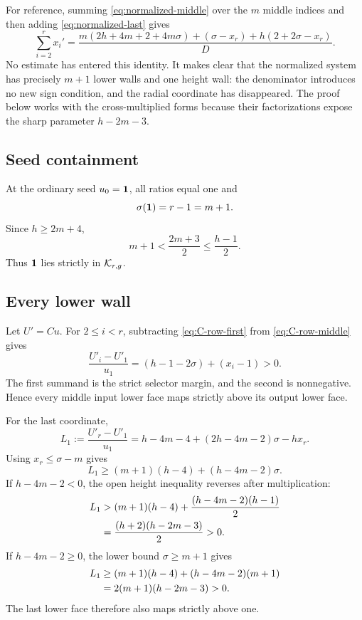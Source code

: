 \documentclass[11pt]{article}
\theoremstyle{remark}
\numberwithin{equation}{section}
\begin{document}
For reference, summing \eqref{eq:normalized-middle} over the \(m\) middle
indices and then adding \eqref{eq:normalized-last} gives
\begin{equation}\label{eq:normalized-height-map}
\sum_{i=2}^{r}x_i'
=\frac{
m(2h+4m+2+4m\sigma)+(\sigma-x_r)
+h(2+2\sigma-x_r)}
{D}.
\end{equation}
No estimate has entered this identity.  It makes clear that the normalized
system has precisely \(m+1\) lower walls and one height wall: the denominator
introduces no new sign condition, and the radial coordinate has disappeared.
The proof below works with the cross-multiplied forms because their
factorizations expose the sharp parameter \(h-2m-3\).

\subsection{Seed containment}

At the ordinary seed \(u_0=\mathbf{1}\), all ratios equal one and
\begin{equation}\label{eq:seed-sigma}
\sigma(\mathbf{1})=r-1=m+1.
\end{equation}
Since \(h\geq2m+4\),
\begin{equation}\label{eq:seed-inside}
m+1<\frac{2m+3}{2}\leq\frac{h-1}{2}.
\end{equation}
Thus \(\mathbf{1}\) lies strictly in \(\mathcal{K}_{r,g}\).

\subsection{Every lower wall}

Let \(U'=Cu\).  For \(2\leq i<r\), subtracting
\eqref{eq:C-row-first} from \eqref{eq:C-row-middle} gives
\begin{equation}\label{eq:middle-wall}
\frac{U'_i-U'_1}{u_1}
=(h-1-2\sigma)+(x_i-1)>0.
\end{equation}
The first summand is the strict selector margin, and the second is
nonnegative.  Hence every middle input lower face maps strictly above its
output lower face.

For the last coordinate,
\begin{equation}\label{eq:last-wall-L1}
L_1:=\frac{U'_r-U'_1}{u_1}
=h-4m-4+(2h-4m-2)\sigma-hx_r.
\end{equation}
Using \(x_r\leq\sigma-m\) gives
\begin{equation}\label{eq:last-wall-reduced}
L_1\geq(m+1)(h-4)+(h-4m-2)\sigma.
\end{equation}
If \(h-4m-2<0\), the open height inequality reverses after multiplication:
\begin{align}
L_1
&>(m+1)(h-4)+\frac{(h-4m-2)(h-1)}2 \notag\\
&=\frac{(h+2)(h-2m-3)}2>0.
\label{eq:last-wall-negative}
\end{align}
If \(h-4m-2\geq0\), the lower bound \(\sigma\geq m+1\) gives
\begin{align}
L_1
&\geq(m+1)(h-4)+(h-4m-2)(m+1) \notag\\
&=2(m+1)(h-2m-3)>0.
\label{eq:last-wall-positive}
\end{align}
The last lower face therefore also maps strictly above one.
\end{document}
